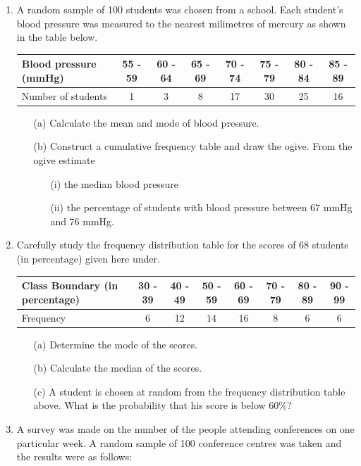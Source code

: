 \begin{enumerate}
	\item A random sample of 100 students was chosen from a school. Each student's blood pressure was measured to the nearest milimetres of mercury as shown in the table below.\\
	
	\begin{tabular}{|l|c|c|c|c|c|c|c|} \hline
	Blood pressure (mmHg)&55 - 59&60 - 64&65 - 69&70 - 74&75 - 79&80 - 84&85 - 89 \\ \hline
	Number of students&1&3&8&17&30&25&16 \\ \hline
	\end{tabular}
	
	\begin{itemize}
	\item[(a)] Calculate the mean and mode of blood pressure.
	\item[(b)] Construct a cumulative frequency table and draw the ogive. From the ogive estimate
		\begin{itemize}
		\item[(i)] the median blood pressure
		\item[(ii)] the percentage of students with blood pressure between 67 mmHg and 76 mmHg.
		\end{itemize}
	\end{itemize}
	
	\item Carefully study the frequency distribution table for the scores of 68 students (in percentage) given here under.\\
	
	\begin{tabular}{|p{3cm}|c|c|c|c|c|c|c|} \hline
	Class Boundary (in percentage)&30 - 39&40 - 49&50 - 59&60 - 69&70 - 79&80 - 89&90 - 99 \\ \hline	
	Frequency&6&12&14&16&8&6&6 \\ \hline
	\end{tabular}
	
	\begin{itemize}
	\item[(a)] Determine the mode of the scores.
	\item[(b)] Calculate the median of the scores.
	\item[(c)] A student is chosen at random from the frequency distribution table above. What is the probability that his score is below 60\%?
	\end{itemize}
	
	\item A survey was made on the number of the people attending conferences on one particular week. A random sample of 100 conference centres was taken and the results were as follows:\\
	

\end{enumerate}
